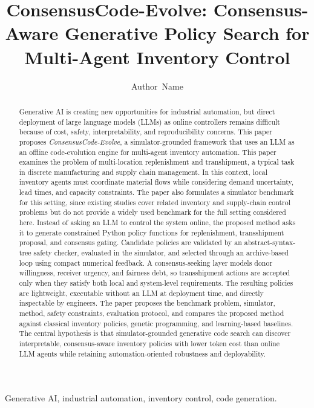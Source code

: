 \documentclass[journal]{IEEEtran}
\title{ConsensusCode-Evolve: Consensus-Aware Generative Policy Search for Multi-Agent Inventory Control}
\author{Author~Name}
\begin{document}
\maketitle

\begin{abstract}
Generative AI is creating new opportunities for industrial automation, but direct deployment of large language models (LLMs) as online controllers remains difficult because of cost, safety, interpretability, and reproducibility concerns. This paper proposes \emph{ConsensusCode-Evolve}, a simulator-grounded framework that uses an LLM as an offline code-evolution engine for multi-agent inventory automation. This paper examines the problem of multi-location replenishment and transhipment, a typical task in discrete manufacturing and supply chain management. In this context, local inventory agents must coordinate material flows while considering demand uncertainty, lead times, and capacity constraints. The paper also formulates a simulator benchmark for this setting, since existing studies cover related inventory and supply-chain control problems but do not provide a widely used benchmark for the full setting considered here. Instead of asking an LLM to control the system online, the proposed method asks it to generate constrained Python policy functions for replenishment, transshipment proposal, and consensus gating. Candidate policies are validated by an abstract-syntax-tree safety checker, evaluated in the simulator, and selected through an archive-based loop using compact numerical feedback. A consensus-seeking layer models donor willingness, receiver urgency, and fairness debt, so transshipment actions are accepted only when they satisfy both local and system-level requirements. The resulting policies are lightweight, executable without an LLM at deployment time, and directly inspectable by engineers. The paper proposes the benchmark problem, simulator, method, safety constraints, evaluation protocol, and compares the proposed method against classical inventory policies, genetic programming, and learning-based baselines. The central hypothesis is that simulator-grounded generative code search can discover interpretable, consensus-aware inventory policies with lower token cost than online LLM agents while retaining automation-oriented robustness and deployability.
\end{abstract}

\begin{IEEEkeywords}
Generative AI, industrial automation, inventory control, code generation.
\end{IEEEkeywords}
\end{document}
